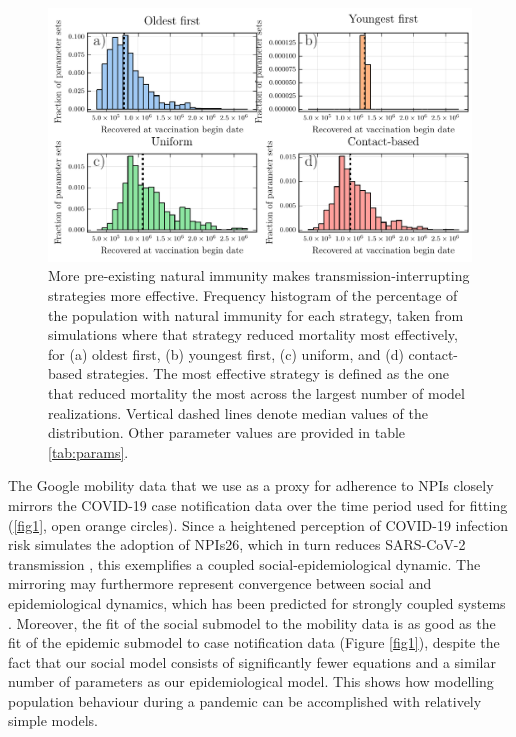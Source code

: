 \begin{figure}
  \includegraphics[width=\textwidth]{chapter_1/histograms.pdf}  
\caption[More pre-existing natural immunity makes transmission-interrupting strategies more effective.]{More pre-existing natural immunity makes transmission-interrupting strategies more effective. Frequency histogram of the percentage of the population with natural immunity for each strategy, taken from simulations where that strategy reduced mortality most effectively, for (a) oldest first, (b) youngest first, (c) uniform, and (d) contact-based strategies. The most effective strategy is defined as the one that reduced mortality the most across the largest number of model realizations. Vertical dashed lines denote median values of the distribution. Other parameter values are provided in table \ref{tab:params}.}
\label{fig6}
\end{figure}
The Google mobility data that we use as a proxy for adherence to NPIs closely mirrors the COVID-19 case notification data over the time period used for fitting (\ref{fig1}, open orange circles).  Since a heightened perception of COVID-19 infection risk simulates the adoption of NPIs26, which in turn reduces SARS-CoV-2 transmission \cite{anderson2020estimating,peak2020individual}, this exemplifies a coupled  social-epidemiological dynamic.  The mirroring may furthermore represent convergence between social and epidemiological dynamics, which has been predicted for strongly coupled systems \cite{sigdel2019convergence}. Moreover, the fit of the social submodel to the mobility data is as good as the fit of the epidemic submodel to case notification data (Figure \ref{fig1}), despite the fact that our social model consists of significantly fewer equations and a similar number of parameters as our epidemiological model. This shows how modelling population behaviour during a pandemic can be accomplished with relatively simple models. 

